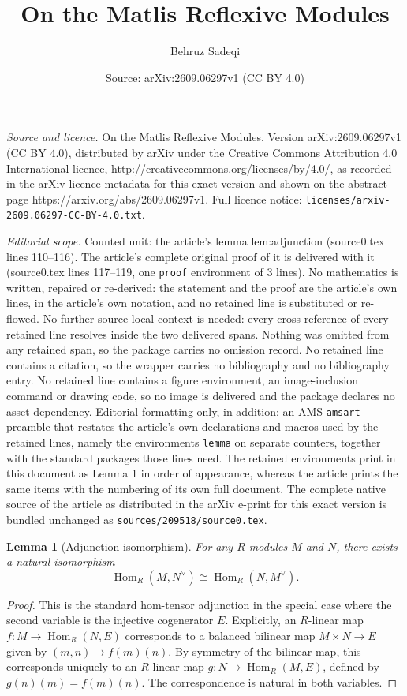 \documentclass[10pt,a4paper]{amsart}
\title{On the Matlis Reflexive Modules}
\author{Behruz Sadeqi}
\date{Source: arXiv:2609.06297v1 (CC BY 4.0)}
\newtheorem{lemma}{Lemma}
\begin{document}
\maketitle

\noindent\emph{Source and licence.} On the Matlis Reflexive Modules. Version arXiv:2609.06297v1 (CC BY 4.0), distributed by arXiv under the Creative Commons Attribution 4.0 International licence, http://creativecommons.org/licenses/by/4.0/, as recorded in the arXiv licence metadata for this exact version and shown on the abstract page https://arxiv.org/abs/2609.06297v1. Full licence notice: \texttt{licenses/arxiv-2609.06297-CC-BY-4.0.txt}.\par\smallskip

\noindent\textit{Editorial scope.} Counted unit: the article's lemma lem:adjunction (source0.tex lines 110--116). The article's complete original proof of it is delivered with it (source0.tex lines 117--119, one \texttt{proof} environment of 3 lines). No mathematics is written, repaired or re-derived: the statement and the proof are the article's own lines, in the article's own notation, and no retained line is substituted or re-flowed.  No further source-local context is needed: every cross-reference of every retained line resolves inside the two delivered spans.  Nothing was omitted from any retained span, so the package carries no omission record.  No retained line contains a citation, so the wrapper carries no bibliography and no bibliography entry.  No retained line contains a figure environment, an image-inclusion command or drawing code, so no image is delivered and the package declares no asset dependency.  Editorial formatting only, in addition: an AMS \texttt{amsart} preamble that restates the article's own declarations and macros used by the retained lines, namely the environments \texttt{lemma} on separate counters, together with the standard packages those lines need.  The retained environments print in this document as Lemma 1 in order of appearance, whereas the article prints the same items with the numbering of its own full document.  The complete native source of the article as distributed in the arXiv e-print for this exact version is bundled unchanged as \texttt{sources/209518/source0.tex}.
\begin{lemma}[Adjunction isomorphism]
\label{lem:adjunction}
For any \( R \)-modules \( M \) and \( N \), there exists a natural isomorphism
\[
\operatorname{Hom}_R(M, N^\vee) \cong \operatorname{Hom}_R(N, M^\vee).
\]
\end{lemma}

\begin{proof}
This is the standard hom-tensor adjunction in the special case where the second variable is the injective cogenerator \( E \). Explicitly, an \( R \)-linear map \( f : M \to \operatorname{Hom}_R(N, E) \) corresponds to a balanced bilinear map \( M \times N \to E \) given by \( (m, n) \mapsto f(m)(n) \). By symmetry of the bilinear map, this corresponds uniquely to an \( R \)-linear map \( g : N \to \operatorname{Hom}_R(M, E) \), defined by \( g(n)(m) = f(m)(n) \). The correspondence is natural in both variables. 
\end{proof}
\end{document}

